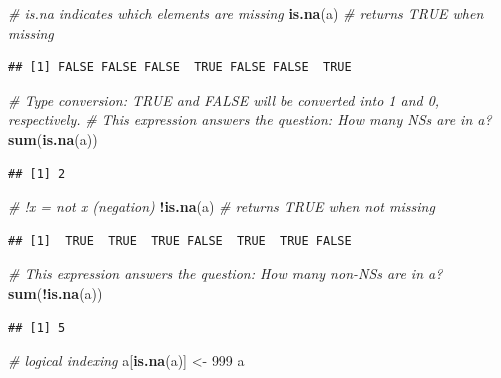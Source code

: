 \documentclass[]{book}
\newenvironment{Shaded}{\begin{snugshade}}{\end{snugshade}}
\newcommand{\CommentTok}[1]{\textcolor[rgb]{0.56,0.35,0.01}{\textit{#1}}}
\newcommand{\DecValTok}[1]{\textcolor[rgb]{0.00,0.00,0.81}{#1}}
\newcommand{\KeywordTok}[1]{\textcolor[rgb]{0.13,0.29,0.53}{\textbf{#1}}}
\newcommand{\NormalTok}[1]{#1}
\newcommand{\OperatorTok}[1]{\textcolor[rgb]{0.81,0.36,0.00}{\textbf{#1}}}
\newcommand{\StringTok}[1]{\textcolor[rgb]{0.31,0.60,0.02}{#1}}
\begin{document}
\begin{Shaded}
\begin{Highlighting}[]
\CommentTok{# is.na indicates which elements are missing}
\KeywordTok{is.na}\NormalTok{(a)  }\CommentTok{# returns TRUE when missing}
\end{Highlighting}
\end{Shaded}

\begin{verbatim}
## [1] FALSE FALSE FALSE  TRUE FALSE FALSE  TRUE
\end{verbatim}

\begin{Shaded}
\begin{Highlighting}[]
\CommentTok{# Type conversion: TRUE and FALSE will be converted into 1 and 0, respectively. }
\CommentTok{# This expression answers the question: How many NSs are in a?}
\KeywordTok{sum}\NormalTok{(}\KeywordTok{is.na}\NormalTok{(a))}
\end{Highlighting}
\end{Shaded}

\begin{verbatim}
## [1] 2
\end{verbatim}

\begin{Shaded}
\begin{Highlighting}[]
\CommentTok{# !x = not x (negation)}
\OperatorTok{!}\KeywordTok{is.na}\NormalTok{(a)  }\CommentTok{# returns TRUE when not missing}
\end{Highlighting}
\end{Shaded}

\begin{verbatim}
## [1]  TRUE  TRUE  TRUE FALSE  TRUE  TRUE FALSE
\end{verbatim}

\begin{Shaded}
\begin{Highlighting}[]
\CommentTok{# This expression answers the question: How many non-NSs are in a?}
\KeywordTok{sum}\NormalTok{(}\OperatorTok{!}\KeywordTok{is.na}\NormalTok{(a))}
\end{Highlighting}
\end{Shaded}

\begin{verbatim}
## [1] 5
\end{verbatim}

\begin{Shaded}
\begin{Highlighting}[]
\CommentTok{# logical indexing}
\NormalTok{a[}\KeywordTok{is.na}\NormalTok{(a)] <-}\StringTok{ }\DecValTok{999}
\NormalTok{a}
\end{Highlighting}
\end{Shaded}
\end{document}
